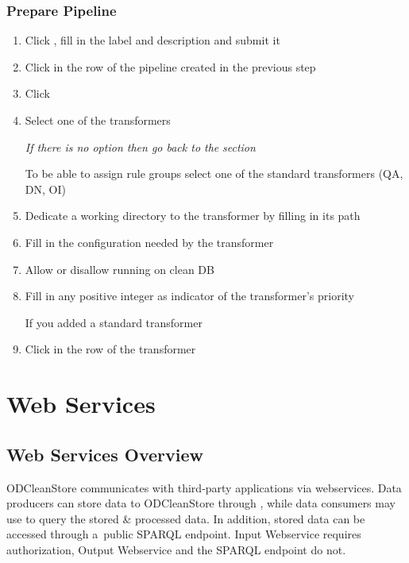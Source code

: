 \subsection*{Prepare Pipeline}
\begin{enumerate}[resume]
	\item Click , fill in the label and description and submit it
	\item Click  in the row of the pipeline created in the previous step
	\item Click 
	\item Select one of the transformers
	
	\emph{If there is no option then go back to the} \textbf{} \emph{section}
	
	To be able to assign rule groups select one of the standard transformers (QA, DN, OI)
	
	\item Dedicate a working directory to the transformer by filling in its path
	\item Fill in the configuration needed by the transformer
	\item Allow or disallow running on clean DB
	\item Fill in any positive integer as indicator of the transformer's priority\newline 

	  If you added a standard transformer
	\item Click  in the row of the transformer

	
	

\end{enumerate}


\chapter{Web Services}
\section{Web Services Overview}
ODCleanStore communicates with third-party applications via webservices. Data producers can store data to ODCleanStore through , while data consumers may use  to query the stored \& processed data. In addition, stored data can be accessed through a~public SPARQL endpoint. Input Webservice requires authorization, Output Webservice and the SPARQL endpoint do not.

